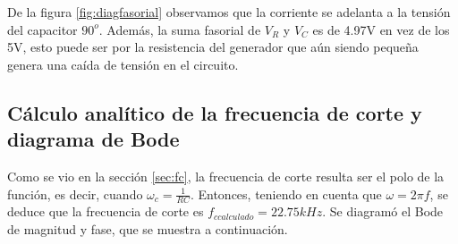 De la figura \ref{fig:diagfasorial} observamos que la corriente se adelanta a la tensión del capacitor $90^{o}$. Además, la suma fasorial de $V_R$ y $V_C$ es de 4.97V en vez de los 5V, esto puede ser por la resistencia del generador que aún siendo pequeña genera una caída de tensión en el circuito.

\subsection{Cálculo analítico de la frecuencia de corte y diagrama de Bode}

Como se vio en la sección \ref{sec:fc}, la frecuencia de corte resulta ser el polo de la función, es decir, cuando 
$\omega_c=\frac{1}{RC}$. Entonces, teniendo en cuenta que $\omega=2\pi f$, se deduce que la frecuencia de corte es $f_{ccalculado}=22.75kHz$. 
Se diagramó el Bode de magnitud y fase, que se muestra a continuación.

